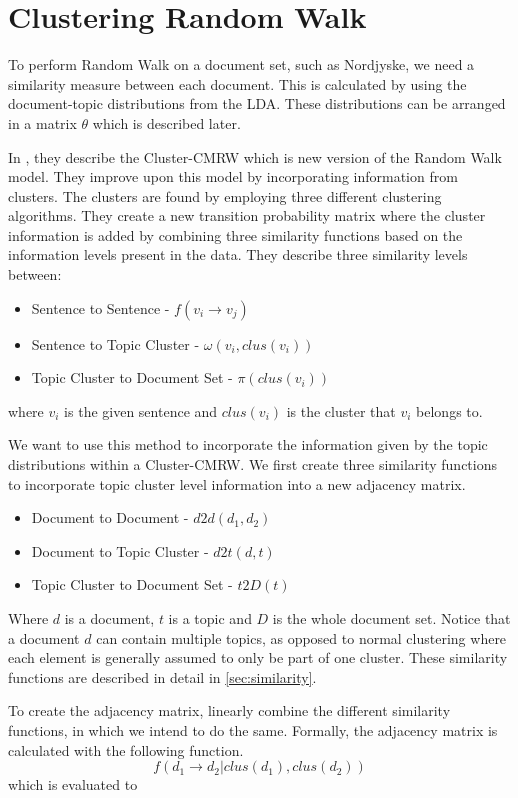\section{Clustering Random Walk}
To perform Random Walk on a document set, such as Nordjyske, we need a similarity measure between each document.
This is calculated by using the document-topic distributions from the \gls{LDA}.
These distributions can be arranged in a matrix $\theta$ which is described later.

In \cite{ClusterPageRank}, they describe the \gls{Cluster-CMRW} which is new version of the Random Walk model. 
They improve upon this model by incorporating information from clusters. 
The clusters are found by employing three different clustering algorithms.
They create a new transition probability matrix where the cluster information is added by combining three similarity functions based on the information levels present in the data.
They describe three similarity levels between:
\begin{itemize}
    \item Sentence to Sentence - $f(v_i \rightarrow v_j)$
    \item Sentence to Topic Cluster - $\omega(v_i, clus(v_i))$
    \item Topic Cluster to Document Set - $\pi(clus(v_i))$
\end{itemize}
where $v_i$ is the given sentence and $clus(v_i)$ is the cluster that $v_i$ belongs to.

We want to use this method to incorporate the information given by the topic distributions within a \gls{Cluster-CMRW}. 
We first create three similarity functions to incorporate topic cluster level information into a new adjacency matrix.
\begin{itemize}
    \item Document to Document - $d2d(d_1, d_2)$
    \item Document to Topic Cluster - $d2t(d,t)$
    \item Topic Cluster to Document Set - $t2D(t)$
\end{itemize}

\noindent
Where $d$ is a document, $t$ is a topic and $D$ is the whole document set.
Notice that a document $d$ can contain multiple topics, as opposed to normal clustering where each element is generally assumed to only be part of one cluster.
These similarity functions are described in detail in \autoref{sec:similarity}.

To create the adjacency matrix, \cite{ClusterPageRank} linearly combine the different similarity functions, in which we intend to do the same.
Formally, the adjacency matrix is calculated with the following function.
$$ f(d_1 \rightarrow d_2 | clus(d_1), clus(d_2)) $$
which is evaluated to 

